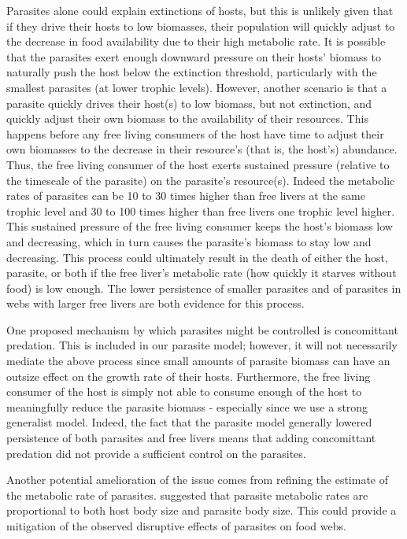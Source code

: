 \documentclass[/home/nkappler/Research/Dissertation/dissertation.tex]{subfiles}
\begin{document}
\begin{bibunit}
Parasites alone could explain extinctions of hosts, but this is unlikely given
that if they drive their hosts to low biomasses, their population will quickly
adjust to the decrease in food availability due to their high metabolic rate.
It is possible that the parasites exert enough downward pressure on their
hosts' biomass to naturally push the host below the extinction threshold,
particularly with the smallest parasites (at lower trophic levels). However,
another scenario is that a parasite quickly drives their host(s) to low
biomass, but not extinction, and quickly adjust their own biomass to the
availability of their resources. This happens before any free living consumers
of the host have time to adjust their own biomasses to the decrease in their
resource's (that is, the host's) abundance. Thus, the free living consumer of
the host exerts sustained pressure (relative to the timescale of the parasite)
on the parasite's resource(s). Indeed the metabolic rates of parasites can be
10 to 30 times higher than free livers at the same trophic level and 30 to 100
times higher than free livers one trophic level higher.  This sustained
pressure of the free living consumer keeps the host's biomass low and
decreasing, which in turn causes the parasite's biomass to stay low and
decreasing. This process could ultimately result in the death of either the
host, parasite, or both if the free liver's metabolic rate (how quickly it
starves without food) is low enough. The lower persistence of smaller parasites
and of parasites in webs with larger free livers are both evidence for this
process. 

One proposed mechanism by which parasites might be controlled is concomittant
predation. This is included in our parasite model; however, it will not
necessarily mediate the above process since small amounts of parasite biomass
can have an outsize effect on the growth rate of their hosts. Furthermore, the
free living consumer of the host is simply not able to consume enough of the
host to meaningfully reduce the parasite biomass - especially since we use a
strong generalist model. Indeed, the fact that the parasite model generally
lowered persistence of both parasites and free livers means that adding
concomittant predation did not provide a sufficient control on the parasites. 

Another potential amelioration of the issue comes from refining the estimate of
the metabolic rate of parasites. \cite*{Hechinger2013} suggested that parasite
metabolic rates are proportional to both host body size and parasite body size.
This could provide a mitigation of the observed disruptive effects of parasites
on food webs.


\end{bibunit}
\end{document}
